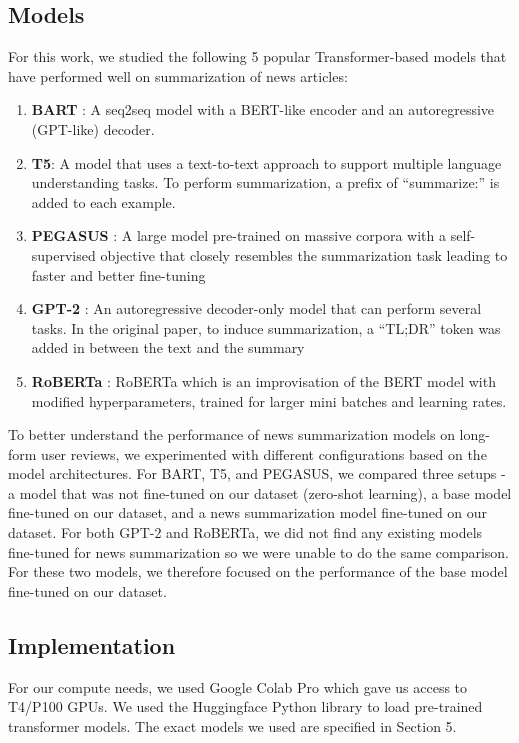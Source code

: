 \documentclass{article}
\begin{document}
\subsection{Models}
For this work, we studied the following 5 popular Transformer-based models that have performed well on summarization of news articles:
\begin{enumerate}
\item {\textbf{BART} \cite{bart}: A seq2seq model with a BERT-like encoder and an autoregressive (GPT-like) decoder.}
\item {\textbf{T5}\cite{t5abstractive}: A model that uses a text-to-text approach to support multiple language understanding tasks. To perform summarization, a prefix of “summarize:” is added to each example.}
\item {\textbf{PEGASUS} \cite{pegasus}: A large model pre-trained on massive corpora with a self-supervised objective that closely resembles the summarization task leading to faster and better fine-tuning}
\item {\textbf{GPT-2}\cite{gpt2ForSummarization} : An autoregressive decoder-only model that can perform several tasks. In the original paper, to induce summarization, a “TL;DR” token was added in between the text and the summary}
\item {\textbf{RoBERTa}\cite{originalRoBerta} : RoBERTa which is an improvisation of the BERT model with modified hyperparameters, trained for larger mini batches and learning rates.}
\end{enumerate}
To better understand the performance of news summarization models on long-form user reviews, we experimented with different configurations based on the model architectures. For BART, T5, and PEGASUS, we compared three setups - a model that was not fine-tuned on our dataset (zero-shot learning), a base model fine-tuned on our dataset, and a news summarization model fine-tuned on our dataset. For both GPT-2 and RoBERTa, we did not find any existing models fine-tuned for news summarization so we were unable to do the same comparison. For these two models, we therefore focused on the performance of the base model fine-tuned on our dataset.

\subsection{Implementation}
For our compute needs, we used Google Colab Pro  \cite{GoogleColab} which gave us access to T4/P100 GPUs. We used the Huggingface Python library \cite{HuggingFace} to load pre-trained transformer models. The exact models we used are specified in Section 5. 
\end{document}
